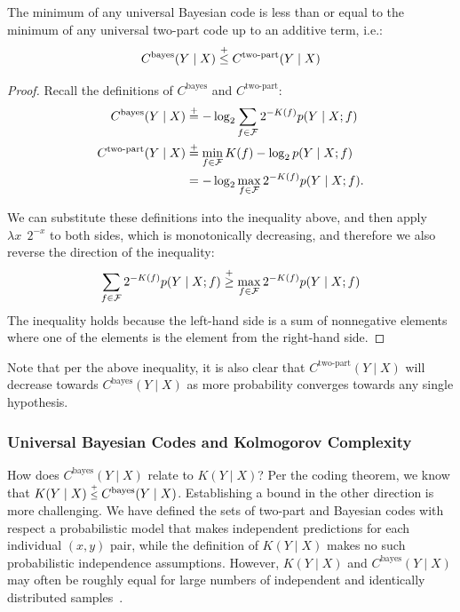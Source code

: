 \begin{lemma}\label{thm:relation-bayesian-two-part}
The minimum of any universal Bayesian code is less than or equal to the minimum of any universal two-part code up to an additive term, i.e.:
\begin{equation}
C^{\text{bayes}}(Y \mid X) \leqc C^{\text{two-part}}(Y \mid X)
\end{equation}
\end{lemma}
\begin{proof}

Recall the definitions of $C^{\text{bayes}}$ and 
$C^{\text{two-part}}$:
\begin{align}
C^{\text{bayes}}(Y \mid X) &\stackrel{+}{=} -\log_2 \sum_{f \in {\mathcal{F}}} 2^{-K(f)} p(Y \mid X;f) \\ 
C^{\text{two-part}}(Y \mid X) &\stackrel{+}{=} \min_{f \in {\mathcal{F}}} K(f) - \log_2 p(Y \mid X;f) \\
&= -\log_2 \max_{f \in {\mathcal{F}}} 2^{-K(f)}  p(Y \mid X;f).
\end{align}

We can substitute these definitions into the inequality above, and then apply $\lambda x~~2^{-x}$ to both sides, which is monotonically decreasing, and therefore we also reverse the direction of the inequality:
\begin{align}
     \sum_{f \in {\mathcal{F}}} 2^{-K(f)} p(Y \mid X;f) \stackrel{+}{\geq} \max_{f \in {\mathcal{F}}} 2^{-K(f)} p(Y \mid X;f) 
\end{align}
The inequality holds because the left-hand side is a sum of nonnegative elements where one of the elements is the element from the right-hand side.
\end{proof}

Note that per the above inequality, it is also clear that $C^{\text{two-part}}(Y \mid X)$ will decrease towards $C^{\text{bayes}}(Y \mid X)$ as more probability converges towards any single hypothesis.

\subsubsection{Universal Bayesian Codes and Kolmogorov Complexity}\label{sec:relation-bayesian-kolmogorov}

How does $C^{\text{bayes}}(Y \mid X)$ relate to $K(Y \mid X)$? Per the coding theorem, we know that $K(Y \mid X) \leqc C^{\text{bayes}}(Y \mid X)$. Establishing a bound in the other direction is more challenging. We have defined the sets of two-part and Bayesian codes with respect a probabilistic model that makes independent predictions for each individual $(x,y)$ pair, while the definition of $K(Y \mid X)$ makes no such probabilistic independence assumptions. However, $K(Y \mid X)$ and $C^{\text{bayes}}(Y \mid X)$ may often be roughly equal for large numbers of independent and identically distributed samples~\citep[Section 5]{li2008introduction}.

